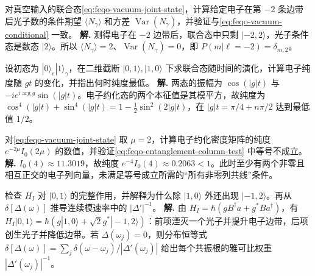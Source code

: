 \par
\begin{workedexample}
对真空输入的联合态\cref{eq:feqo-vacuum-joint-state}，计算给定电子在第 \(-2\) 条边带后光子数的条件期望 \(\langle N_\gamma\rangle\) 和方差 \(\operatorname{Var}(N_\gamma)\)，并验证与\cref{eq:feqo-vacuum-conditional} 一致。
\textbf{解.} 测得电子在 \(-2\) 边带后，联合态中只剩 \(|-2,2\rangle\)，光子条件态是数态 \(|2\rangle\)。所以 \(\langle N_\gamma\rangle=2\)、\(\operatorname{Var}(N_\gamma)=0\)，即 \(P(m|\ell=-2)=\delta_{m,2}\)。
\end{workedexample}
\par

\par
\begin{workedexample}
设初态为 \(|0\rangle_e|1\rangle_\gamma\)，在二维截断 \(|0,1\rangle,|1,0\rangle\) 下求联合态随时间的演化，计算电子纯度随 \(gt\) 的变化，并指出何时纯度最低。
\textbf{解.} 两态的振幅为 \(\cos(|g|t)\) 与 \(-i e^{i\arg g}\sin(|g|t)\)。电子约化态的两个本征值是其模平方，故纯度为 \(\cos^4(|g|t)+\sin^4(|g|t)=1-\tfrac12\sin^2(2|g|t)\)，在 \(|g|t=\pi/4+n\pi/2\) 达到最低值 \(1/2\)。
\end{workedexample}
\par

\par
\begin{workedexample}
对\cref{eq:feqo-vacuum-joint-state} 取 \(\mu=2\)，计算电子约化密度矩阵的纯度 \(e^{-2\mu}I_0(2\mu)\) 的数值，并验证\cref{eq:feqo-entanglement-column-test} 中等号不成立。
\textbf{解.} \(I_0(4)\approx11.3019\)，故纯度 \(e^{-4}I_0(4)\approx0.2063<1\)。此时至少有两个非零且相互正交的电子列向量，未满足等号成立所需的“所有非零列共线”条件。
\end{workedexample}
\par

\par
\begin{workedexample}
检查 \(H_I\) 对 \(|0,1\rangle\) 的完整作用，并解释为什么除 \(|1,0\rangle\) 外还出现 \(|-1,2\rangle\)。再从 \(\delta[\Delta(\omega)]\) 推导连续模速率中的 \(|\Delta'|^{-1}\)。
\textbf{解.} 由 \(H_I=\hbar(gB^\dagger a+g^*Ba^\dagger)\)，有 \(H_I|0,1\rangle=\hbar(g|1,0\rangle+\sqrt2g^*|-1,2\rangle)\)：前项湮灭一个光子并提升电子边带，后项创生光子并降低边带。若 \(\Delta(\omega_j)=0\)，则分布恒等式 \(\delta[\Delta(\omega)]=\sum_j\delta(\omega-\omega_j)/|\Delta'(\omega_j)|\) 给出每个共振根的雅可比权重 \(|\Delta'(\omega_j)|^{-1}\)。
\end{workedexample}
\par

